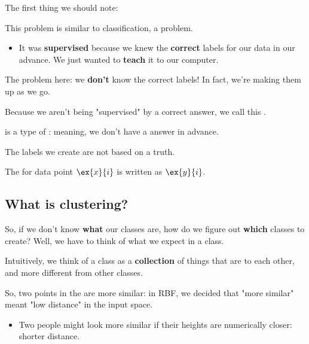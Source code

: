         The first thing we should note: 
        
        This problem is similar to classification, a  problem.

        \begin{itemize}
            \item It was \textbf{supervised} because we knew the \textbf{correct} labels for our data in our advance. We just wanted to \textbf{teach} it to our computer.
        \end{itemize}
        
        The problem here: we \textbf{don't} know the correct labels! In fact, we're making them up as we go. 
        
        Because we aren't being "supervised" by a correct answer, we call this .\\
        
        \begin{concept}
             is a type of : meaning, we don't have a  answer in advance.
            
            The labels we create are not based on a  truth.
            
            The  for data point $\ex{x}{i}$ is written as $\ex{y}{i}$.
        \end{concept}
        
    \subsection{What is clustering?}
    
        So, if we don't know \textbf{what} our classes are, how do we figure out \textbf{which} classes to create? Well, we have to think of what we expect in a class.
        
        Intuitively, we think of a class as a \textbf{collection} of things that are  to each other, and more different from other classes.

        

        So, two points in the  are more similar: in RBF, we decided that "more similar" meant "low distance" in the input space.

        \begin{itemize}
            \item \miniex Two people might look more similar if their heights are numerically closer: shorter distance.
        \end{itemize}
        
